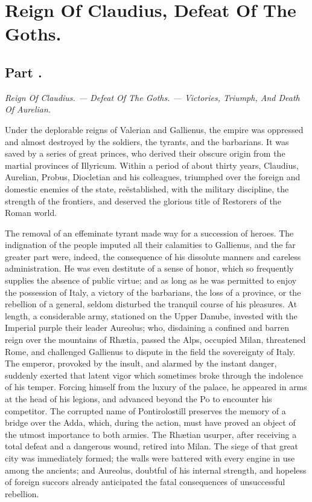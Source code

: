 \chapter{Reign Of Claudius, Defeat Of The Goths.}
\section{Part \thesection.}

\textit{Reign Of Claudius. — Defeat Of The Goths. — Victories, Triumph, And
Death Of Aurelian.}
\vspace{\onelineskip}

Under the deplorable reigns of Valerian and Gallienus, the empire
was oppressed and almost destroyed by the soldiers, the tyrants,
and the barbarians. It was saved by a series of great princes,
who derived their obscure origin from the martial provinces of
Illyricum. Within a period of about thirty years, Claudius,
Aurelian, Probus, Diocletian and his colleagues, triumphed over
the foreign and domestic enemies of the state, reëstablished,
with the military discipline, the strength of the frontiers, and
deserved the glorious title of Restorers of the Roman world.

The removal of an effeminate tyrant made way for a succession of
heroes. The indignation of the people imputed all their
calamities to Gallienus, and the far greater part were, indeed,
the consequence of his dissolute manners and careless
administration. He was even destitute of a sense of honor, which
so frequently supplies the absence of public virtue; and as long
as he was permitted to enjoy the possession of Italy, a victory
of the barbarians, the loss of a province, or the rebellion of a
general, seldom disturbed the tranquil course of his pleasures.
At length, a considerable army, stationed on the Upper Danube,
invested with the Imperial purple their leader Aureolus; who,
disdaining a confined and barren reign over the mountains of
Rhætia, passed the Alps, occupied Milan, threatened Rome, and
challenged Gallienus to dispute in the field the sovereignty of
Italy. The emperor, provoked by the insult, and alarmed by the
instant danger, suddenly exerted that latent vigor which
sometimes broke through the indolence of his temper. Forcing
himself from the luxury of the palace, he appeared in arms at the
head of his legions, and advanced beyond the Po to encounter his
competitor. The corrupted name of Pontirolo\footnotemark[1] still preserves the
memory of a bridge over the Adda, which, during the action, must
have proved an object of the utmost importance to both armies.
The Rhætian usurper, after receiving a total defeat and a
dangerous wound, retired into Milan. The siege of that great city
was immediately formed; the walls were battered with every engine
in use among the ancients; and Aureolus, doubtful of his internal
strength, and hopeless of foreign succors already anticipated the
fatal consequences of unsuccessful rebellion.

